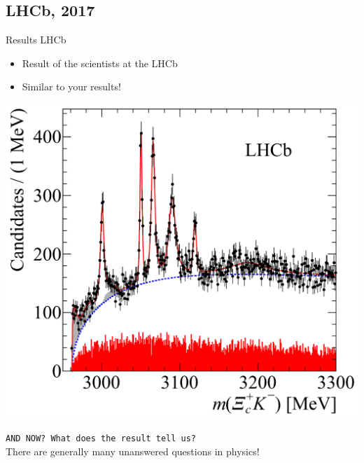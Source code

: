 \subsection{LHCb, 2017}
\begin{frame}{Results LHCb}
 \begin{minipage}{0.49\textwidth}
 \begin{itemize}
        \item<1-> Result of the scientists at the LHCb \hspace{2cm }
        \item<1-> Similar to your results!
    \end{itemize}

\end{minipage}\begin{minipage}{0.49\textwidth}

\includegraphics[width=\textwidth]{Figures Discussion/Result_OmegaC_spectrum_LHCb.png}
\end{minipage}

\begin{center}
   \texttt{AND NOW? What does the result tell us?} \\ 
        There are generally many unanswered questions in physics! 
\end{center}
    
\end{frame}
